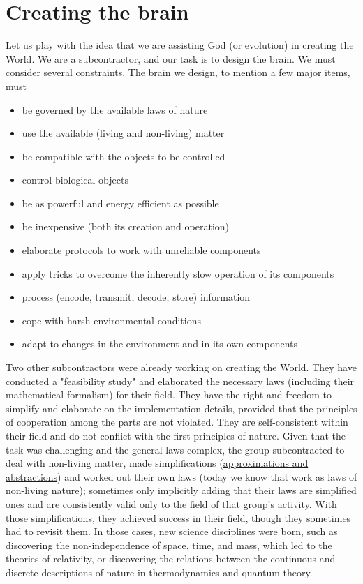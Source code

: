 \section{Creating the brain\label{sec:SINGLE_ABSTRACT_CREATING}}
Let us play with the idea that we are assisting God (or evolution) in creating the World.
We are a subcontractor, and our task is to design the brain. We must consider several constraints.  The brain we design, to mention 
a few major items, must
\begin{itemize}
\item be governed by the available laws of nature
\item use the available (living and non-living) matter
\item be compatible with the objects to be controlled
\item control biological objects
\item be as powerful and energy efficient as possible
\item be inexpensive (both its creation and operation)
\item elaborate protocols to work with unreliable components
\item apply tricks to overcome the inherently slow operation of its components
\item process (encode, transmit, decode, store) information
\item cope with harsh environmental conditions 
\item adapt to changes in the environment and in its own components
\end{itemize}


Two other subcontractors were already working on creating the World. They have conducted a "feasibility study" and elaborated the necessary laws (including their mathematical formalism) for their field. They have the right and freedom to simplify and elaborate on the implementation details, provided that the principles of cooperation among the parts are not violated. They are self-consistent within their field and do not conflict with the first principles of nature. Given that the task was challenging and the general laws complex, the group subcontracted to deal with non-living matter,
made simplifications (\hyperlink{Abstractions}{approximations and abstractions}) and worked out their own laws (today we know that work as laws of non-living nature); sometimes only implicitly 
adding that their laws are simplified ones and are consistently valid only
to the field of that group's activity.
With those simplifications, they achieved success in their field, though they sometimes had to revisit them. In those cases, new science disciplines were born,
such as discovering the non-independence of space, time, and mass, which led to the theories of relativity, or discovering the relations between the continuous and discrete descriptions of nature in thermodynamics and quantum theory.

